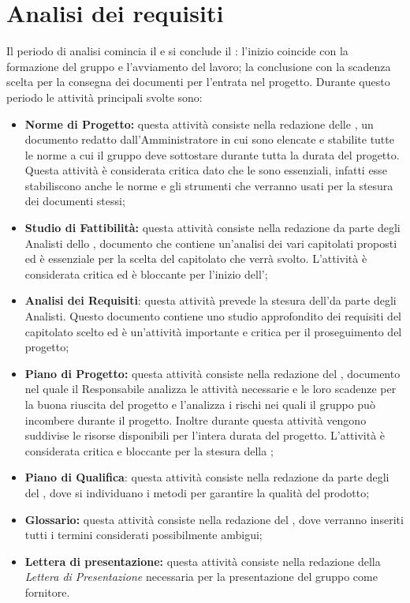 \documentclass[PianoDiProgetto.tex]{subfiles}
\begin{document}
\section{Analisi dei requisiti}
Il periodo di analisi comincia il  e si conclude il : l'inizio coincide con la formazione del gruppo e l'avviamento del lavoro; la conclusione con la scadenza scelta per la consegna dei documenti per l'entrata nel progetto. Durante questo periodo le attività principali svolte sono:
\begin{itemize}
	\item \textbf{Norme di Progetto:} questa attività consiste nella redazione delle \ndp, un documento redatto dall'Amministratore in cui sono elencate e stabilite tutte le norme a cui il gruppo \gruppo deve sottostare durante tutta la durata del progetto. Questa attività è considerata critica dato che le \ndp sono essenziali, infatti esse stabiliscono anche le norme e gli strumenti che verranno usati per la stesura dei documenti stessi;
	\item \textbf{Studio di Fattibilità:} questa attività consiste nella redazione da parte degli Analisti dello \sdf, documento che contiene un'analisi dei vari capitolati proposti ed è essenziale per la scelta del capitolato che verrà svolto. L'attività è considerata critica ed è bloccante per l'inizio dell'\adr;
	
	\item \textbf{Analisi dei Requisiti}: questa attività prevede la stesura dell'\adr da parte degli Analisti. Questo documento contiene uno studio approfondito dei requisiti del capitolato scelto ed è un'attività importante e critica per il proseguimento del progetto;
	
	\item \textbf{Piano di Progetto:} questa attività consiste nella redazione del \pdp, documento nel quale il Responsabile analizza le attività necessarie e le loro scadenze per la buona riuscita del progetto e l'\amme analizza i rischi nei quali il gruppo \gruppo può incombere durante il progetto. Inoltre durante questa attività vengono suddivise le risorse disponibili per l'intera durata del progetto. L'attività è considerata critica e bloccante per la stesura della ;
	\item \textbf{Piano di Qualifica}: questa attività consiste nella redazione da parte degli \ammi del \pdq, dove si individuano i metodi per garantire la qualità del prodotto;
	\item \textbf{Glossario:} questa attività consiste nella redazione del \g, dove verranno inseriti tutti i termini considerati possibilmente ambigui;
	\item \textbf{Lettera di presentazione:} questa attività consiste nella redazione della \textit{Lettera di Presentazione} necessaria per la presentazione del gruppo \gruppo come fornitore. 	
\end{itemize}	
\end{document}
